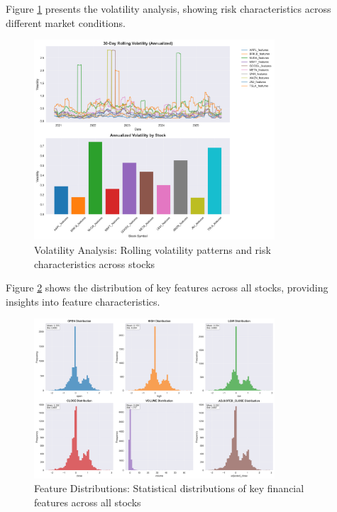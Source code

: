 \documentclass[11pt]{article}
\begin{document}
Figure \ref{fig:volatility_analysis} presents the volatility analysis, showing risk characteristics across different market conditions.

\begin{figure}[H]
\centering
\includegraphics[width=0.8\textwidth]{figures/eda_volatility_analysis.png}
\caption{Volatility Analysis: Rolling volatility patterns and risk characteristics across stocks}
\label{fig:volatility_analysis}
\end{figure}

Figure \ref{fig:feature_distributions} shows the distribution of key features across all stocks, providing insights into feature characteristics.

\begin{figure}[H]
\centering
\includegraphics[width=0.8\textwidth]{figures/eda_feature_distributions_fixed.png}
\caption{Feature Distributions: Statistical distributions of key financial features across all stocks}
\label{fig:feature_distributions}
\end{figure}
\end{document}
